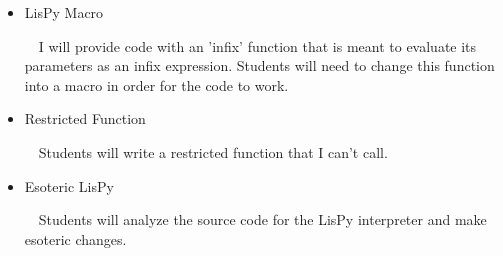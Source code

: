 \documentclass[11pt]{article}
\begin{document}
\begin{itemize}
\item LisPy Macro

$\ \ \ $ I will provide code with an 'infix' function that is meant to evaluate its parameters as an infix expression. Students will need to change this function into a macro in order for the code to work.

\item Restricted Function

$\ \ \ $ Students will write a restricted function that I can't call.

\item Esoteric LisPy

$\ \ \ $ Students will analyze the source code for the LisPy interpreter and make esoteric changes.

\end{itemize}
\end{document}
